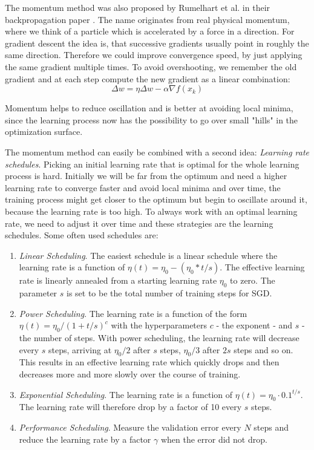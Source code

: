 The momentum method was also proposed by Rumelhart et al. in their backpropagation paper \cite{rumelhart1986learning}. The name originates from real physical momentum, where we think of a particle which is accelerated by a force in a direction. For gradient descent the idea is, that successive gradients usually point in roughly the same direction. Therefore we could improve convergence speed, by just applying the same gradient multiple times. To avoid overshooting, we remember the old gradient and at each step compute the new gradient as a linear combination: 
    \[\Delta w = \eta \Delta w - \alpha \nabla f(x_k)\]

Momentum helps to reduce oscillation and is better at avoiding local minima, since the learning process now has the possibility to go over small "hills" in the optimization surface.

The momentum method can easily be combined with a second idea: \textit{Learning rate schedules}. Picking an initial learning rate that is optimal for the whole learning process is hard. Initially we will be far from the optimum and need a higher learning rate to converge faster and avoid local minima and over time, the training process might get closer to the optimum but begin to oscillate around it, because the learning rate is too high. To always work with an optimal learning rate, we need to adjust it over time and these strategies are the learning schedules. Some often used schedules are:

\begin{enumerate}
  \item \textit{Linear Scheduling}. The easiest schedule is a linear schedule where the learning rate is a function of $\eta(t) = \eta_0 - (\eta_0 * t/s)$. The effective learning rate is linearly annealed from a starting learning rate $\eta_0$ to zero. The parameter $s$ is set to be the total number of training steps for SGD.
  \item \textit{Power Scheduling}. The learning rate is a function of the form $\eta(t) = \eta_0 / (1 + t/s)^c$ with the hyperparameters $c$ - the exponent - and $s$ - the number of steps. With power scheduling, the learning rate will decrease every $s$ steps, arriving at $\eta_0 / 2$ after $s$ steps, $\eta_0 / 3$ after $2s$ steps and so on. This results in an effective learning rate which quickly drops and then decreases more and more slowly over the course of training.
  \item \textit{Exponential Scheduling}. The learning rate is a function of $\eta(t) = \eta_0 \cdot 0.1^{t/s}$. The learning rate will therefore drop by a factor of 10 every $s$ steps.
  \item \textit{Performance Scheduling}. Measure the validation error every $N$ steps and reduce the learning rate by a factor $\gamma$ when the error did not drop. 
\end{enumerate}

